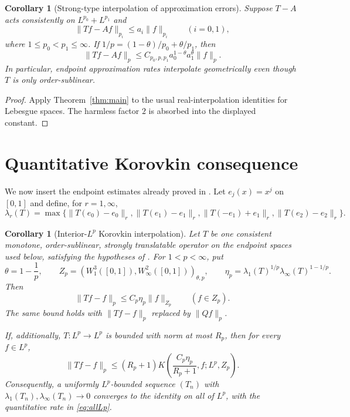 \documentclass[11pt]{article}
\newtheorem{corollary}[theorem]{Corollary}
\newcommand{\Qop}{Q}
\newcommand{\Kfun}{K}
\begin{document}
\begin{corollary}[Strong-type interpolation of approximation errors]
Suppose $T-A$ acts consistently on $L^{p_0}+L^{p_1}$ and
\[
 \|Tf-Af\|_{p_i}\leq a_i\|f\|_{p_i}\qquad(i=0,1),
\]
where $1\leq p_0<p_1\leq\infty$. If
$1/p=(1-\theta)/p_0+\theta/p_1$, then
\[
 \|Tf-Af\|_p\leq C_{p_0,p,p_1}
 a_0^{1-\theta}a_1^\theta\|f\|_p.
\]
In particular, endpoint approximation rates interpolate geometrically even
though $T$ is only order-sublinear.
\end{corollary}

\begin{proof}
Apply Theorem~\ref{thm:main} to the usual real-interpolation identities for
Lebesgue spaces. The harmless factor $2$ is absorbed into the displayed
constant.
\end{proof}

\section{Quantitative Korovkin consequence}

We now insert the endpoint estimates already proved in \cite{GN}. Let
$e_j(x)=x^j$ on $[0,1]$ and define, for $r=1,\infty$,
\begin{equation}\label{eq:lambda}
 \lambda_r(T)=\max\bigl\{
 \|T(e_0)-e_0\|_r,
 \|T(e_1)-e_1\|_r,
 \|T(-e_1)+e_1\|_r,
 \|T(e_2)-e_2\|_r\bigr\}.
\end{equation}

\begin{corollary}[Interior-$L^p$ Korovkin interpolation]\label{cor:korovkin}
Let $T$ be one consistent monotone, order-sublinear, strongly translatable
operator on the endpoint spaces used below, satisfying the hypotheses of
\cite[Theorem~2]{GN}. For $1<p<\infty$, put
\[
 \theta=1-\frac1p,
 \qquad
 Z_p=(W_1^3([0,1]),W_\infty^2([0,1]))_{\theta,p},
 \qquad
 \eta_p=\lambda_1(T)^{1/p}
          \lambda_\infty(T)^{1-1/p}.
\]
Then
\begin{equation}\label{eq:smoothkorovkin}
 \|Tf-f\|_p\leq C_p\eta_p\|f\|_{Z_p}
 \qquad(f\in Z_p).
\end{equation}
The same bound holds with $\|Tf-f\|_p$ replaced by $\|\Qop f\|_p$.

If, additionally, $T:L^p\to L^p$ is bounded with norm at most $R_p$, then
for every $f\in L^p$,
\begin{equation}\label{eq:allLp}
 \|Tf-f\|_p
 \leq (R_p+1)
 \Kfun\!\left(\frac{C_p\eta_p}{R_p+1},
 f;L^p,Z_p\right).
\end{equation}
Consequently, a uniformly $L^p$-bounded sequence $(T_n)$ with
$\lambda_1(T_n),\lambda_\infty(T_n)\to0$ converges to the identity on all
of $L^p$, with the quantitative rate in \eqref{eq:allLp}.
\end{corollary}
\end{document}
